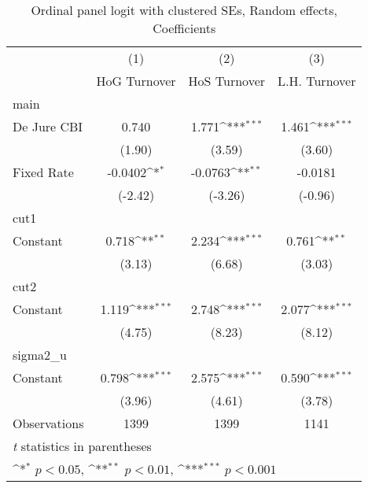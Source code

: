 \begin{table}[htbp]\centering
\def\sym#1{\ifmmode^{#1}\else\(^{#1}\)\fi}
\caption{Ordinal panel logit with clustered SEs, Random effects, Coefficients \label{coeffordLogDJ}}
\begin{tabular}{l*{3}{c}}
\toprule
                                        &\multicolumn{1}{c}{(1)}&\multicolumn{1}{c}{(2)}&\multicolumn{1}{c}{(3)}\\
                                        &\multicolumn{1}{c}{HoG Turnover}&\multicolumn{1}{c}{HoS Turnover}&\multicolumn{1}{c}{L.H. Turnover}\\
\midrule
main                                    &                  &                  &                  \\
De Jure CBI                             &    0.740         &    1.771\sym{***}&    1.461\sym{***}\\
                                        &   (1.90)         &   (3.59)         &   (3.60)         \\
\addlinespace
Fixed Rate                              &  -0.0402\sym{*}  &  -0.0763\sym{**} &  -0.0181         \\
                                        &  (-2.42)         &  (-3.26)         &  (-0.96)         \\
\midrule
cut1                                    &                  &                  &                  \\
Constant                                &    0.718\sym{**} &    2.234\sym{***}&    0.761\sym{**} \\
                                        &   (3.13)         &   (6.68)         &   (3.03)         \\
\midrule
cut2                                    &                  &                  &                  \\
Constant                                &    1.119\sym{***}&    2.748\sym{***}&    2.077\sym{***}\\
                                        &   (4.75)         &   (8.23)         &   (8.12)         \\
\midrule
sigma2\_u                                &                  &                  &                  \\
Constant                                &    0.798\sym{***}&    2.575\sym{***}&    0.590\sym{***}\\
                                        &   (3.96)         &   (4.61)         &   (3.78)         \\
\midrule
Observations                            &     1399         &     1399         &     1141         \\
\bottomrule
\multicolumn{4}{l}{\footnotesize \textit{t} statistics in parentheses}\\
\multicolumn{4}{l}{\footnotesize \sym{*} \(p<0.05\), \sym{**} \(p<0.01\), \sym{***} \(p<0.001\)}\\
\end{tabular}
\end{table}
